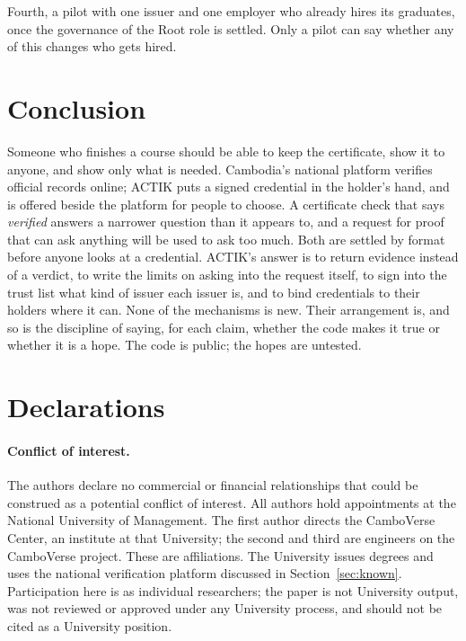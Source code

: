 \documentclass[10pt,a4paper,twocolumn]{article}
\begin{document}
Fourth, a pilot with one issuer and one employer who already hires its graduates,
once the governance of the Root role is settled. Only a pilot can say whether any
of this changes who gets hired.

\section{Conclusion}
\label{sec:conclusion}

Someone who finishes a course should be able to keep the certificate, show it to
anyone, and show only what is needed. Cambodia's national platform verifies
official records online; ACTIK puts a signed credential in the holder's hand, and
is offered beside the platform for people to choose. A certificate check that
says \emph{verified} answers a narrower question than it
appears to, and a request for proof that can ask anything will be used to ask too
much. Both are settled by format before anyone looks at a credential. ACTIK's
answer is to return evidence instead of a verdict, to write the limits on asking
into the request itself, to sign into the trust list what kind of issuer each
issuer is, and to bind credentials to their holders where it can. None of the
mechanisms is new. Their arrangement is, and so is the discipline of saying, for
each claim, whether the code makes it true or whether it is a hope. The code is
public; the hopes are untested.

\section*{Declarations}

\paragraph{Conflict of interest.} The authors declare no commercial or financial
relationships that could be construed as a potential conflict of interest. All
authors hold appointments at the National University of Management. The first
author directs the CamboVerse Center, an institute at that University; the second
and third are engineers on the CamboVerse project. These are affiliations. The University
issues degrees and uses the national verification platform discussed in
Section~\ref{sec:known}. Participation here is as individual researchers; the
paper is not University output, was not reviewed or approved under any University
process, and should not be cited as a University position.
\end{document}
